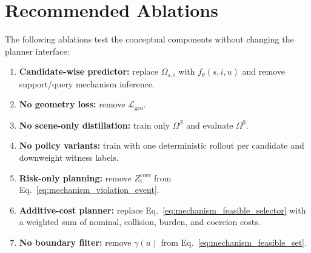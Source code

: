 \documentclass[10pt]{article}
\newcommand{\cS}{\mathcal{S}}
\begin{document}
\section{Recommended Ablations}
\label{app:ablations}

The following ablations test the conceptual components without changing the planner interface:
\begin{enumerate}[leftmargin=*]
    \item \textbf{Candidate-wise predictor:} replace \(\Omega_{s,i}\) with \(f_\theta(s,i,u)\) and remove support/query mechanism inference.
    \item \textbf{No geometry loss:} remove \(\mathcal L_{\mathrm{geo}}\).
    \item \textbf{No scene-only distillation:} train only \(\Omega^{\cS}\) and evaluate \(\Omega^{0}\).
    \item \textbf{No policy variants:} train with one deterministic rollout per candidate and downweight witness labels.
    \item \textbf{Risk-only planning:} remove \(Z_i^{\mathrm{coer}}\) from Eq.~\eqref{eq:mechanism_violation_event}.
    \item \textbf{Additive-cost planner:} replace Eq.~\eqref{eq:mechanism_feasible_selector} with a weighted sum of nominal, collision, burden, and coercion costs.
    \item \textbf{No boundary filter:} remove \(\gamma(u)\) from Eq.~\eqref{eq:mechanism_feasible_set}.
\end{enumerate}

\printbibliography
\end{document}
